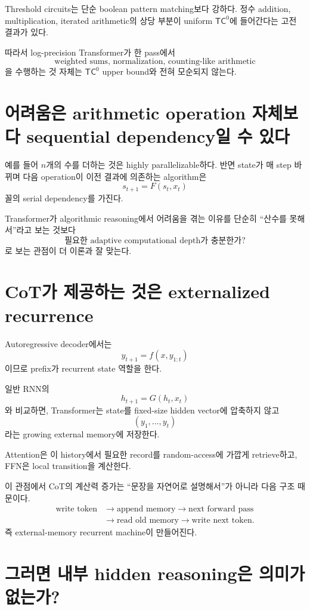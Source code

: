 \documentclass[11pt,a4paper,oneside,openany]{memoir}
\theoremstyle{definition}
\newcommand{\TC}{\mathsf{TC}}
\begin{document}
Threshold circuits는 단순 boolean pattern matching보다 강하다.
정수 addition, multiplication, iterated arithmetic의 상당 부분이 uniform $\TC^0$에 들어간다는 고전 결과가 있다.

따라서 log-precision Transformer가 한 pass에서
\[
\text{weighted sums, normalization, counting-like arithmetic}
\]
을 수행하는 것 자체는 $\TC^0$ upper bound와 전혀 모순되지 않는다.

\section{어려움은 arithmetic operation 자체보다 sequential dependency일 수 있다}

예를 들어 $n$개의 수를 더하는 것은 highly parallelizable하다.
반면 state가 매 step 바뀌며 다음 operation이 이전 결과에 의존하는 algorithm은
\[
s_{t+1}=F(s_t,x_t)
\]
꼴의 serial dependency를 가진다.

Transformer가 algorithmic reasoning에서 어려움을 겪는 이유를 단순히 ``산수를 못해서''라고 보는 것보다
\[
\boxed{\text{필요한 adaptive computational depth가 충분한가?}}
\]
로 보는 관점이 더 이론과 잘 맞는다.

\section{CoT가 제공하는 것은 externalized recurrence}

Autoregressive decoder에서는
\[
y_{t+1}=f(x,y_{1:t})
\]
이므로 prefix가 recurrent state 역할을 한다.

일반 RNN의
\[
h_{t+1}=G(h_t,x_t)
\]
와 비교하면, Transformer는 state를 fixed-size hidden vector에 압축하지 않고
\[
(y_1,\dots,y_t)
\]
라는 growing external memory에 저장한다.

Attention은 이 history에서 필요한 record를 random-access에 가깝게 retrieve하고,
FFN은 local transition을 계산한다.

\begin{suppbox}
이 관점에서 CoT의 계산력 증가는 ``문장을 자연어로 설명해서''가 아니라 다음 구조 때문이다.
\[
\begin{aligned}
\text{write token}
&\rightarrow \text{append memory}
\rightarrow \text{next forward pass}\\
&\rightarrow \text{read old memory}
\rightarrow \text{write next token}.
\end{aligned}
\]
즉 external-memory recurrent machine이 만들어진다.
\end{suppbox}

\section{그러면 내부 hidden reasoning은 의미가 없는가?}
\end{document}
